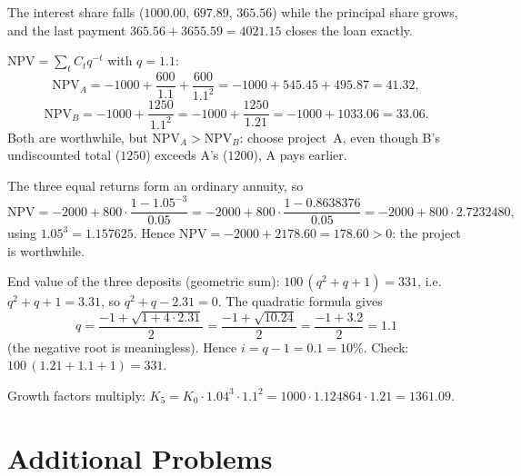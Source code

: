 \begin{solutions}
        The interest share falls ($1000.00$, $697.89$, $365.56$) while
        the principal share grows, and the last payment
        $365.56+3655.59=4021.15$ closes the loan exactly.

  \item $\mathrm{NPV}=\sum_{t}C_{t}q^{-t}$ with $q=1.1$:
        \[
          \mathrm{NPV}_{A}=-1000+\frac{600}{1.1}+\frac{600}{1.1^{2}}
          =-1000+545.45+495.87=41.32 ,
        \]
        \[
          \mathrm{NPV}_{B}=-1000+\frac{1250}{1.1^{2}}
          =-1000+\frac{1250}{1.21}=-1000+1033.06=33.06 .
        \]
        Both are worthwhile, but $\mathrm{NPV}_{A}>\mathrm{NPV}_{B}$:
        choose project~A, even though B's undiscounted total
        ($1250$) exceeds A's ($1200$), A pays earlier.

  \item The three equal returns form an ordinary annuity, so
        \[
          \mathrm{NPV}=-2000+800\cdot\frac{1-1.05^{-3}}{0.05}
          =-2000+800\cdot\frac{1-0.8638376}{0.05}
          =-2000+800\cdot 2.7232480 ,
        \]
        using $1.05^{3}=1.157625$. Hence
        $\mathrm{NPV}=-2000+2178.60=178.60>0$: the project is
        worthwhile.

  \item End value of the three deposits (geometric sum):
        $100\,(q^{2}+q+1)=331$, i.e.\ $q^{2}+q+1=3.31$, so
        $q^{2}+q-2.31=0$. The quadratic formula gives
        \[
          q=\frac{-1+\sqrt{1+4\cdot 2.31}}{2}
           =\frac{-1+\sqrt{10.24}}{2}=\frac{-1+3.2}{2}=1.1
        \]
        (the negative root is meaningless). Hence $i=q-1=0.1=10\%$.
        Check: $100\,(1.21+1.1+1)=331$.

  \item Growth factors multiply:
        $K_{5}=K_{0}\cdot 1.04^{3}\cdot 1.1^{2}
        =1000\cdot 1.124864\cdot 1.21=1361.09$.
\end{solutions}

\section{Additional Problems}

